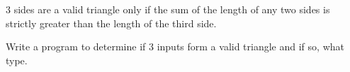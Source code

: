 \documentclass[]{beamer}
\begin{document}
\begin{frame}
3 sides are a valid triangle only if the sum of the 
length of any two sides is strictly greater than the length of the third side.  

Write a program to determine if 3 inputs form a valid triangle and if so,
what type.

%


\end{frame}
\end{document}

